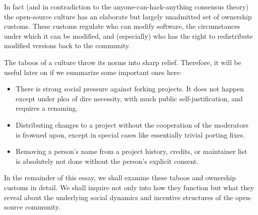 In fact (and in contradiction to the anyone-can-hack-anything consensus theory)
the open-source culture has an elaborate but largely unadmitted set of ownership
customs.  These customs regulate who can modify software, the circumstances
under which it can be modified, and (especially) who has the right to
redistribute modified versions back to the community.

The taboos of a culture throw its norms into sharp relief.  Therefore, it will
be useful later on if we summarize some important ones here:
\begin{itemize}
\item There is strong social pressure against forking projects.  It does not
  happen except under plea of dire necessity, with much public
  self-justification, and requires a renaming.
\item Distributing changes to a project without the cooperation of the
  moderators is frowned upon, except in special cases like essentially trivial
  porting fixes.
\item Removing a person's name from a project history, credits, or maintainer
  list is absolutely not done without the person's explicit consent.
\end{itemize}

In the remainder of this essay, we shall examine these taboos and ownership
customs in detail.  We shall inquire not only into how they function but what
they reveal about the underlying social dynamics and incentive structures of the
open-source community.

